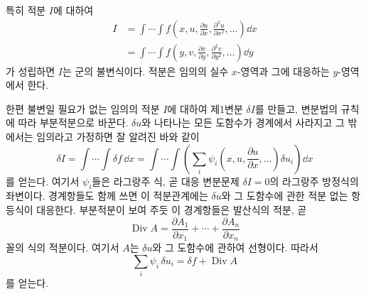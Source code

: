 특히 적분 \(I\)에 대하여
\begin{equation}
\tag{1}
\begin{aligned}
I&=\int\!\cdots\!\int
f\!\left(x,u,\frac{\partial u}{\partial x},
\frac{\partial^2u}{\partial x^2},\ldots\right)\dd x\\
&=\int\!\cdots\!\int
f\!\left(y,v,\frac{\partial v}{\partial y},
\frac{\partial^2v}{\partial y^2},\ldots\right)\dd y
\end{aligned}
\end{equation}
가 성립하면 \(I\)는 군의 불변식이다. 적분은 임의의 실수 \(x\)-영역과 그에 대응하는 \(y\)-영역에서 한다.

한편 불변일 필요가 없는 임의의 적분 \(I\)에 대하여 제1변분 \(\delta I\)를 만들고, 변분법의 규칙에 따라 부분적분으로 바꾼다. \(\delta u\)와 나타나는 모든 도함수가 경계에서 사라지고 그 밖에서는 임의라고 가정하면 잘 알려진 바와 같이
\begin{equation}
\tag{2}
\delta I=\int\!\cdots\!\int\delta f\,\dd x
=\int\!\cdots\!\int
\left(\sum_i\psi_i\!\left(x,u,\frac{\partial u}{\partial x},\ldots\right)
\delta u_i\right)\dd x
\end{equation}
를 얻는다. 여기서 \(\psi_i\)들은 라그랑주 식, 곧 대응 변분문제 \(\delta I=0\)의 라그랑주 방정식의 좌변이다. 경계항들도 함께 쓰면 이 적분관계에는 \(\delta u\)와 그 도함수에 관한 적분 없는 항등식이 대응한다. 부분적분이 보여 주듯 이 경계항들은 발산식의 적분, 곧
\[
\operatorname{Div}A=
\frac{\partial A_1}{\partial x_1}+\cdots+
\frac{\partial A_n}{\partial x_n}
\]
꼴의 식의 적분이다. 여기서 \(A\)는 \(\delta u\)와 그 도함수에 관하여 선형이다. 따라서
\begin{equation}
\tag{3}
\sum_i\psi_i\,\delta u_i=\delta f+\operatorname{Div}A
\end{equation}
를 얻는다.

